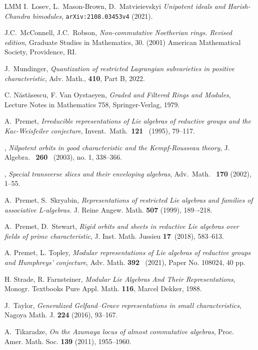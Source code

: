 \documentclass[twoside,12pt,reqno]{amsart}
\theoremstyle{remark}
\numberwithin{equation}{section}
\newcommand{\arxiv}[1]{{\tt arXiv:#1}}
\let\oldu\u
\def\u{\mathfrak{u}}
\begin{document}
\begin{thebibliography}{LMM}
     I.~Losev, L.~Mason-Brown, D.~Matvieievskyi {\em 
Unipotent ideals and Harish-Chandra bimodules}, 
\arxiv{2108.03453v4} (2021).

         J.C.~McConnell, J.C.~Robson, {\em Non-commutative Noetherian rings. Revised edition}, Graduate Studies in Mathematics, 30. (2001) American Mathematical Society, Providence, RI.
  

         J.~Mundinger, {\em Quantization of restricted Lagrangian subvarieties in positive characteristic}, Adv. Math.,
        {\bf 410}, Part B, 2022.

         C. N\oldu{a}st\oldu{a}sescu, F. Van Oystaeyen, {\em Graded and Filtered Rings and Modules}, Lecture Notes in Mathematics 758, Springer-Verlag, 1979.
        
		 A.~Premet,
		{\em Irreducible representations of Lie algebras of reductive groups and the Kac-Weisfeiler conjecture},
		Invent.\ Math.\ {\bf 121} \ (1995), 79--117.
		
		 \bysame,
		{\em Nilpotent orbits in good characteristic and the Kempf-Rousseau theory},
		 J. Algebra. \ {\bf 260} \ (2003), no. 1, 338--366.
		
		\bysame,
		{\em Special transverse slices and their enveloping algebras}, Adv.\ Math. \ {\bf 170} (2002), 1--55.
	

		
     A.~Premet, S.~Skryabin, {\em Representations of restricted Lie algebras and families of associative L-algebras.} J. Reine Angew. Math. {\bf 507} (1999), 189–-218.
        
		A.~Premet, D.~Stewart,
		{\em Rigid orbits and sheets in reductive Lie algebras over fields of prime characteristic}, J. Inst. Math. Jussieu {\bf 17}\, (2018), 583--613. 


        
		A. Premet, L. Topley,
		{\em Modular representations of Lie algebras of reductive
groups and Humphreys’ conjecture}, Adv. Math. {\bf 392} \ (2021), Paper No. 108024, 40 pp.


        
         H. Strade, R. Farnsteiner,
{\em Modular Lie Algebras And Their Representations},
Monogr. Textbooks Pure Appl. Math. 
\textbf{116}, Marcel Dekker, 1988.

     J.~Taylor, {\em Generalized Gelfand–Graev representations in small characteristics}, Nagoya Math. J. {\bf 224} (2016), 93--167.

        A.~Tikaradze, {\em On the Azumaya locus of almost commutative algebras}, Proc. Amer. Math. Soc. {\bf 139} (2011), 1955--1960.

	\end{thebibliography}	
	
\end{document}
